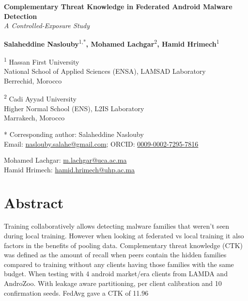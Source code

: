 \documentclass[12pt,letterpaper]{article}
\begin{document}
\thispagestyle{fancy}
\begin{center}
\vspace*{1.5in}
{\bfseries Complementary Threat Knowledge in Federated Android Malware Detection}\\[0.5\baselineskip]
{\itshape A Controlled-Exposure Study}\par\vspace{\baselineskip}
\begin{singlespace}
\textbf{Salaheddine Naslouby}\textsuperscript{1,*}\textbf{, Mohamed Lachgar}\textsuperscript{2}\textbf{, Hamid Hrimech}\textsuperscript{1}

\vspace{0.6\baselineskip}
\textsuperscript{1} Hassan First University\\
National School of Applied Sciences (ENSA), LAMSAD Laboratory\\
Berrechid, Morocco

\vspace{0.6\baselineskip}
\textsuperscript{2} Cadi Ayyad University\\
Higher Normal School (ENS), L2IS Laboratory\\
Marrakech, Morocco

\vspace{0.6\baselineskip}
* Corresponding author: Salaheddine Naslouby\\
Email: \href{mailto:naslouby.salahe@gmail.com}{naslouby.salahe@gmail.com}; ORCID: \href{https://orcid.org/0009-0002-7295-7816}{0009-0002-7295-7816}

\vspace{0.6\baselineskip}
Mohamed Lachgar: \href{mailto:m.lachgar@uca.ac.ma}{m.lachgar@uca.ac.ma}\\
Hamid Hrimech: \href{mailto:hamid.hrimech@uhp.ac.ma}{hamid.hrimech@uhp.ac.ma}
\end{singlespace}
\end{center}
\clearpage

\section*{Abstract}

\noindent Training collaboratively allows detecting malware families that weren't seen during local training. However when looking at federated vs local training it also factors in the benefits of pooling data. Complementary threat knowledge (CTK) was defined as the amount of recall when peers contain the hidden families compared to training without any clients having those families with the same budget. When testing with 4 android market/era clients from LAMDA and AndroZoo. With leakage aware partitioning, per client calibration and 10 confirmation seeds. FedAvg gave a CTK of 11.96%
\end{document}

